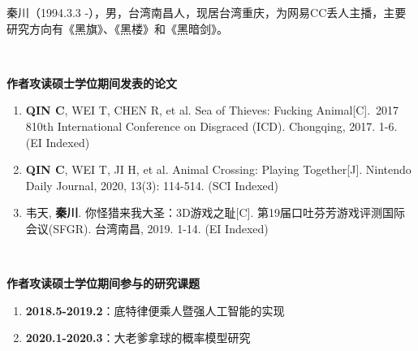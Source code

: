 
秦川（1994.3.3 -），男，台湾南昌人，现居台湾重庆，为网易CC丢人主播，主要研究方向有《黑旗》、《黑楼》和《黑暗剑》。

~~

\begin{flushleft} 
  \bfseries\large 作者攻读硕士学位期间发表的论文\\
  \relax
\end{flushleft}

\begin{enumerate}
  \renewcommand{\labelenumi}{[\theenumi].}
  \item \textbf{QIN C}, WEI T, CHEN R, et al. Sea of Thieves: Fucking Animal[C]. 2017 810th International Conference on Disgraced (ICD). Chongqing, 2017. 1-6. (EI Indexed)
  \item \textbf{QIN C}, WEI T, JI H, et al. Animal Crossing: Playing Together[J]. Nintendo Daily Journal, 2020, 13(3): 114-514. (SCI Indexed)
  \item 韦天, \textbf{秦川}. 你怪猎来我大圣：3D游戏之耻[C]. 第19届口吐芬芳游戏评测国际会议(SFGR). 台湾南昌, 2019. 1-14. (EI Indexed)
\end{enumerate}

~~

\begin{flushleft}
  \bfseries\large 作者攻读硕士学位期间参与的研究课题\\
  \relax
\end{flushleft}

\begin{enumerate}
  \renewcommand{\labelenumi}{[\theenumi].}
  \item \textbf{2018.5-2019.2}：底特律便乘人暨强人工智能的实现
  \item \textbf{2020.1-2020.3}：大老爹拿球的概率模型研究
\end{enumerate}
